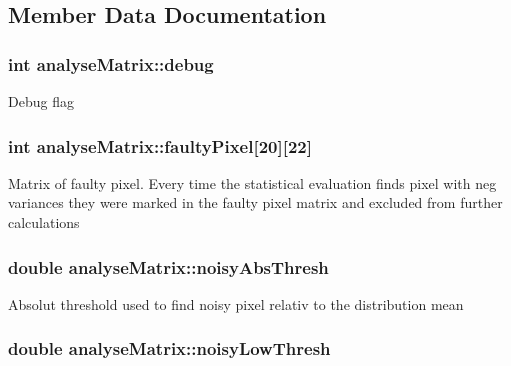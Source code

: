\subsection{Member Data Documentation}
\hypertarget{classanalyseMatrix_a5c3dd03672f12a8a3ad1adbbe15d3a3e}{
\subsubsection[{debug}]{\setlength{\rightskip}{0pt plus 5cm}int analyse\-Matrix\-::debug}}\label{classanalyseMatrix_a5c3dd03672f12a8a3ad1adbbe15d3a3e}
Debug flag \hypertarget{classanalyseMatrix_a8cddd52641a8d1dc2a6cf669584ac440}{
\subsubsection[{faulty\-Pixel}]{\setlength{\rightskip}{0pt plus 5cm}int analyse\-Matrix\-::faulty\-Pixel\mbox{[}20\mbox{]}\mbox{[}22\mbox{]}}}\label{classanalyseMatrix_a8cddd52641a8d1dc2a6cf669584ac440}
Matrix of faulty pixel. Every time the statistical evaluation finds pixel with neg variances they were marked in the faulty pixel matrix and excluded from further calculations \hypertarget{classanalyseMatrix_ab2c3e6805f8c69bb1c2317df1130cffd}{
\subsubsection[{noisy\-Abs\-Thresh}]{\setlength{\rightskip}{0pt plus 5cm}double analyse\-Matrix\-::noisy\-Abs\-Thresh}}\label{classanalyseMatrix_ab2c3e6805f8c69bb1c2317df1130cffd}
Absolut threshold used to find noisy pixel relativ to the distribution mean \hypertarget{classanalyseMatrix_a66744956a995f194e5a018da3aaedc12}{
\subsubsection[{noisy\-Low\-Thresh}]{\setlength{\rightskip}{0pt plus 5cm}double analyse\-Matrix\-::noisy\-Low\-Thresh}}\label{classanalyseMatrix_a66744956a995f194e5a018da3aaedc12}

